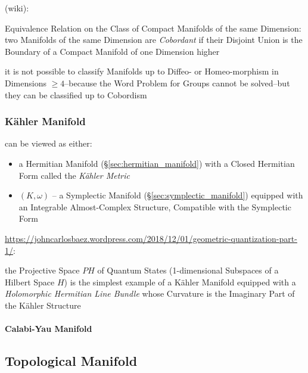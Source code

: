 (wiki):

Equivalence Relation on the Class of Compact Manifolds of the same Dimension:
two Manifolds of the same Dimension are \emph{Cobordant} if their Disjoint
Union is the Boundary of a Compact Manifold of one Dimension higher

it is not possible to classify Manifolds up to Diffeo- or Homeo-morphism in
Dimensions $\geq 4$--because the Word Problem for Groups cannot be solved--but
they can be classified up to Cobordism




\subsubsection{K\"ahler Manifold}\label{sec:kahler_manifold}

can be viewed as either:

\begin{itemize}
\item a Hermitian Manifold (\S\ref{sec:hermitian_manifold}) with a
  Closed Hermitian Form called the \emph{K\"ahler Metric} %
\item $(K,\omega)$ -- a Symplectic Manifold
  (\S\ref{sec:symplectic_manifold}) equipped with an Integrable
  Almost-Complex Structure, Compatible with the Symplectic Form %
\end{itemize}

\url{https://johncarlosbaez.wordpress.com/2018/12/01/geometric-quantization-part-1/}:

the Projective Space $PH$ of Quantum States (1-dimensional Subspaces of a
Hilbert Space $H$) is the simplest example of a K\"ahler Manifold equipped with
a \emph{Holomorphic Hermitian Line Bundle} whose Curvature is the Imaginary Part
of the K\"ahler Structure



\paragraph{Calabi-Yau Manifold}\label{sec:calabi_yau_manifold}



\subsection{Topological Manifold}\label{sec:topological_manifold}

